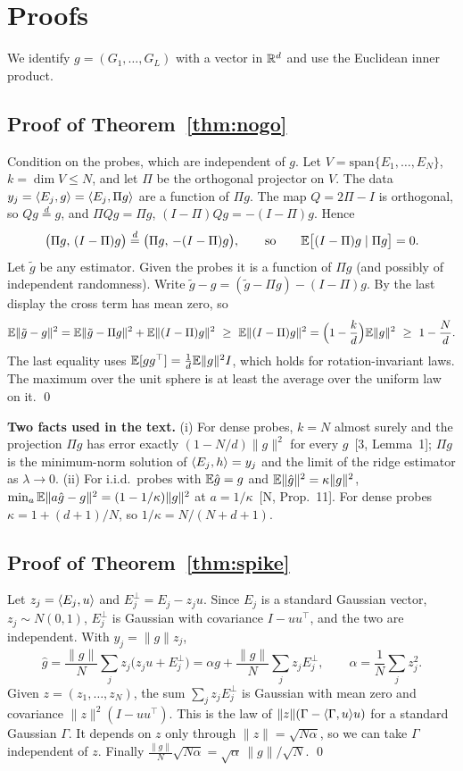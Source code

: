 \section{Proofs}\label{app:proofs}
We identify $g=(G_1,\dots,G_L)$ with a vector in $\mathbb{R}^d$ and use the Euclidean inner product.

\subsection{Proof of Theorem~\ref{thm:nogo}}
Condition on the probes, which are independent of $g$. Let $V=\mathrm{span}\{E_1,\dots,E_N\}$, $k=\dim V\le N$, and let $\Pi$ be the orthogonal projector on $V$. The data $y_j=\langle E_j,g\rangle=\langle E_j,\Pi g\rangle$ are a function of $\Pi g$. The map $Q=2\Pi-I$ is orthogonal, so $Qg\overset d=g$, and $\Pi Qg=\Pi g$, $(I-\Pi)Qg=-(I-\Pi)g$. Hence
\[
\big(\Pi g,\,(I-\Pi)g\big)\overset d=\big(\Pi g,\,-(I-\Pi)g\big),\qquad\text{so}\qquad\mathbb{E}\big[(I-\Pi)g\mid\Pi g\big]=0 .
\]
Let $\tilde g$ be any estimator. Given the probes it is a function of $\Pi g$ (and possibly of independent randomness). Write $\tilde g-g=(\tilde g-\Pi g)-(I-\Pi)g$. By the last display the cross term has mean zero, so
\[
\mathbb{E}\|\tilde g-g\|^2=\mathbb{E}\|\tilde g-\Pi g\|^2+\mathbb{E}\|(I-\Pi)g\|^2\ \ge\ \mathbb{E}\|(I-\Pi)g\|^2=\Big(1-\frac kd\Big)\mathbb{E}\|g\|^2\ \ge\ 1-\frac Nd .
\]
The last equality uses $\mathbb{E}[gg^\top]=\frac1d\mathbb{E}\|g\|^2I$, which holds for rotation-invariant laws. The maximum over the unit sphere is at least the average over the uniform law on it. \qed

\textbf{Two facts used in the text.} (i) For dense probes, $k=N$ almost surely and the projection $\Pi g$ has error exactly $(1-N/d)\|g\|^2$ for every $g$~[3, Lemma~1]; $\Pi g$ is the minimum-norm solution of $\langle E_j,h\rangle=y_j$ and the limit of the ridge estimator as $\lambda\to0$. (ii) For i.i.d.\ probes with $\mathbb{E}\hat g=g$ and $\mathbb{E}\|\hat g\|^2=\kappa\|g\|^2$, $\min_a\mathbb{E}\|a\hat g-g\|^2=(1-1/\kappa)\|g\|^2$ at $a=1/\kappa$~[N, Prop.~11]. For dense probes $\kappa=1+(d+1)/N$, so $1/\kappa=N/(N+d+1)$.

\subsection{Proof of Theorem~\ref{thm:spike}}
Let $z_j=\langle E_j,u\rangle$ and $E_j^\perp=E_j-z_ju$. Since $E_j$ is a standard Gaussian vector, $z_j\sim N(0,1)$, $E_j^\perp$ is Gaussian with covariance $I-uu^\top$, and the two are independent. With $y_j=\|g\|z_j$,
\[
\hat g=\frac{\|g\|}{N}\sum_jz_j\big(z_ju+E_j^\perp\big)=\alpha g+\frac{\|g\|}{N}\sum_jz_jE_j^\perp,\qquad\alpha=\frac1N\sum_jz_j^2 .
\]
Given $z=(z_1,\dots,z_N)$, the sum $\sum_jz_jE_j^\perp$ is Gaussian with mean zero and covariance $\|z\|^2(I-uu^\top)$. This is the law of $\|z\|(\Gamma-\langle \Gamma,u\rangle u)$ for a standard Gaussian $\Gamma$. It depends on $z$ only through $\|z\|=\sqrt{N\alpha}$, so we can take $\Gamma$ independent of $z$. Finally $\frac{\|g\|}{N}\sqrt{N\alpha}=\sqrt\alpha\,\|g\|/\sqrt N$. \qed

